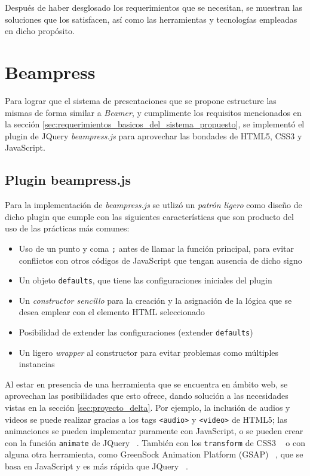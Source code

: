 	Después de haber desglosado los requerimientos que se necesitan, se muestran las soluciones que los satisfacen, así como las herramientas y tecnologías empleadas en dicho propósito. 

	\section{Beampress} %
	\label{sec:beampress}
		Para lograr que el sistema de presentaciones que se propone estructure las mismas de forma similar a \textit{Beamer}, y cumplimente los requisitos mencionados en la sección \ref{sec:requerimientos_basicos_del_sistema_propuesto}, se implementó el plugin de JQuery \textit{beampress.js} para aprovechar las bondades de HTML5, CSS3 y JavaScript.

		\subsection{Plugin beampress.js} %
		\label{sub:beampress_js}
			 Para la implementación de \textit{beampress.js} se utlizó un  \textit{patrón ligero} como diseño de dicho plugin \cite{smashingmagazine} que cumple con las siguientes características que son producto del uso de las prácticas más comunes:

			\begin{itemize}
				\item Uso de un punto y coma \texttt{;} antes de llamar la función principal, para evitar conflictos con otros códigos de JavaScript que tengan ausencia de dicho signo
				\item Un objeto \texttt{defaults}, que tiene las configuraciones iniciales del plugin
				\item Un \textit{constructor sencillo} para la creación y la asignación de la lógica que se desea emplear con el elemento HTML seleccionado
				\item Posibilidad de extender las configuraciones (extender \texttt{defaults})
				\item Un ligero \textit{wrapper} al constructor para evitar problemas como múltiples instancias
			\end{itemize}		


		Al estar en presencia de una herramienta que se encuentra en ámbito web, se aprovechan las posibilidades que esto ofrece, dando solución a las necesidades vistas en la sección \ref{sec:proyecto_delta}. Por ejemplo, la inclusión de audios y videos se puede realizar gracias a los tags \texttt{<audio>} y \texttt{<video>} de HTML5; las animaciones se pueden implementar puramente con JavaScript, o se pueden crear con la función \texttt{animate} de JQuery ~\cite{animate}. También con los \texttt{transform} de CSS3 ~\cite{csstransform} o con alguna otra herramienta, como GreenSock Animation Platform (GSAP) ~\cite{gsap}, que se basa en JavaScript y es más rápida que JQuery ~\cite{jquery}. 


